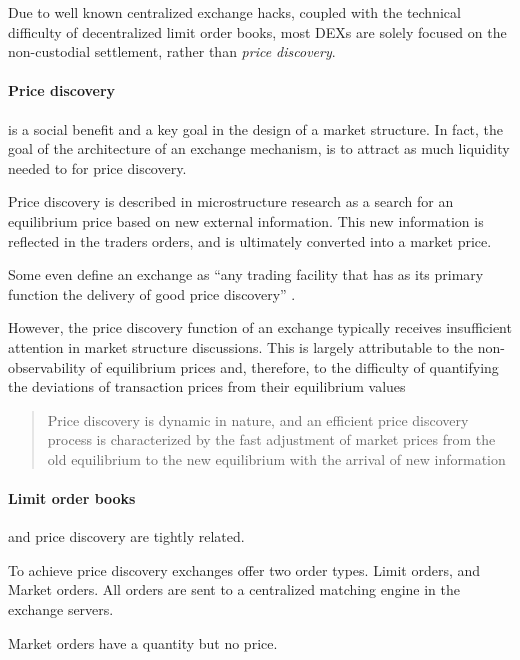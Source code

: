 \documentclass[12pt]{article}
\begin{document}
Due to well known centralized exchange hacks, coupled with the technical difficulty of decentralized limit order books, most DEXs are solely focused on the non-custodial settlement, rather than \emph{price discovery}. 

\paragraph*{Price discovery} is a social benefit and a key goal in the design of a market structure. In fact, the goal of the architecture of an exchange mechanism, is to attract as much liquidity needed to for price discovery.  \cite{francioni_schwartz_2017}

Price discovery is described in microstructure research as a search for an equilibrium price based on new external information. This new information is reflected in the traders orders, and is ultimately converted into a market price. \citep{RePEc:nbr:nberwo:6257}

Some even define an exchange as ``any trading facility that has as its primary function the delivery of good price discovery'' \cite{francioni_schwartz_2017}. 

However, the price discovery function of an  exchange typically receives insufficient attention in market structure discussions. This is largely attributable to the non-observability of equilibrium prices and, therefore, to the difficulty of quantifying the deviations of transaction prices from their equilibrium values \cite{francioni_schwartz_2017}


\begin{quote}
Price discovery is dynamic in nature, and an efficient price discovery process is characterized by the fast adjustment of market prices from the old equilibrium to the new equilibrium with the arrival of new information \cite{RePEc:udb:wpaper:uwec-2005-01-r}    
\end{quote}

\paragraph*{Limit order books} and price discovery are tightly related. \citep{RePEc:nbr:nberwo:6257} \cite{RePEc:eee:jfinec:v:17:y:1986:i:1:p:5-26}

To achieve price discovery exchanges offer two order types. Limit orders, and Market orders. All orders are sent to a centralized matching engine in the exchange servers. 

Market orders have a quantity but no price. 
\end{document}
